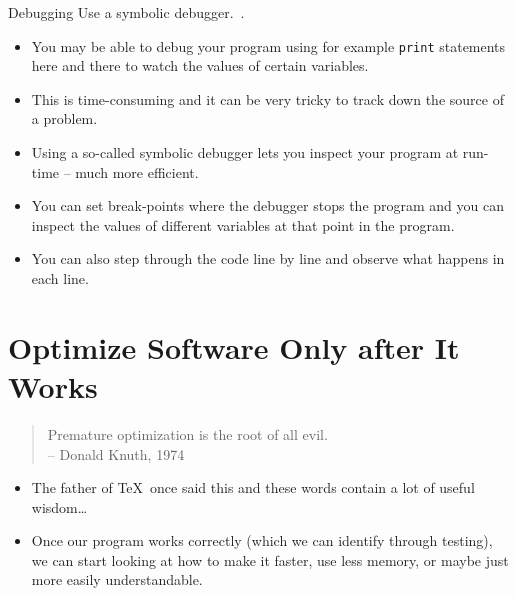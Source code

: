 \documentclass[english]{beamer}
\newcommand{\sectionslide}{\centering\vspace*{25mm}%
  {\bfseries\LARGE \insertsection}}
\begin{document}
\begin{frame}{\insertsection}{Debugging}
  Use a symbolic debugger.~\cite{Wilson2013}.
  \begin{itemize}
  \item You may be able to debug your program using for example
    \texttt{print} statements here and there to watch the values of
    certain variables.
  \item This is time-consuming and it can be very tricky to track down
    the source of a problem.
  \item Using a so-called symbolic debugger lets you inspect your
    program at run-time -- much more efficient.
  \item You can set break-points where the debugger stops the program
    and you can inspect the values of different variables at that
    point in the program.
  \item You can also step through the code line by line and observe
    what happens in each line.
  \end{itemize}
\end{frame}


\section{Optimize Software Only after It Works}%

\begin{frame}
  \sectionslide
\end{frame}


\begin{frame}{\insertsection}
  \begin{quote}
    Premature optimization is the root of all evil.\\
    \hfill -- Donald Knuth, 1974
  \end{quote}
  \begin{itemize}
  \item The father of \TeX\ once said this and these words contain a
    lot of useful wisdom\ldots
  \item Once our program works correctly (which we can identify
    through testing), we can start looking at how to make it faster,
    use less memory, or maybe just more easily understandable.
  \end{itemize}
\end{frame}
\end{document}
